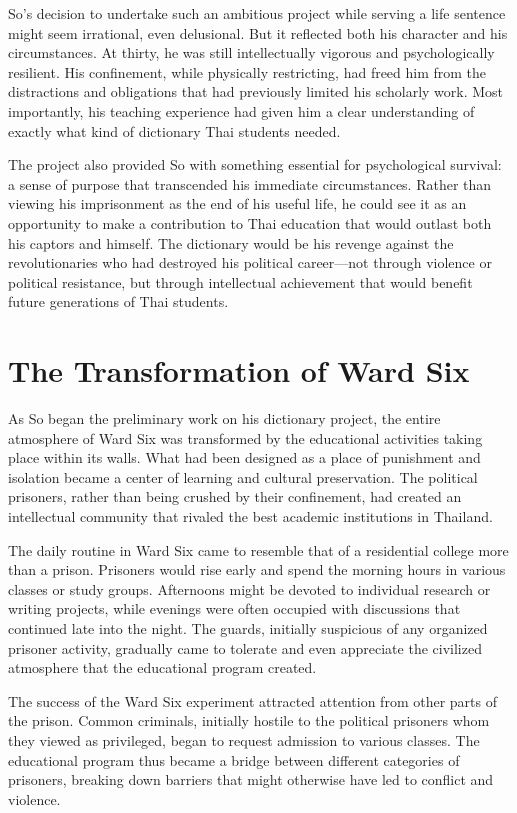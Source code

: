 \documentclass[
  Letterpaper,
]{scrbook}
\begin{document}
So's decision to undertake such an ambitious project while serving a
life sentence might seem irrational, even delusional. But it reflected
both his character and his circumstances. At thirty, he was still
intellectually vigorous and psychologically resilient. His confinement,
while physically restricting, had freed him from the distractions and
obligations that had previously limited his scholarly work. Most
importantly, his teaching experience had given him a clear understanding
of exactly what kind of dictionary Thai students needed.

The project also provided So with something essential for psychological
survival: a sense of purpose that transcended his immediate
circumstances. Rather than viewing his imprisonment as the end of his
useful life, he could see it as an opportunity to make a contribution to
Thai education that would outlast both his captors and himself. The
dictionary would be his revenge against the revolutionaries who had
destroyed his political career---not through violence or political
resistance, but through intellectual achievement that would benefit
future generations of Thai students.

\section{The Transformation of Ward
Six}\label{the-transformation-of-ward-six}

As So began the preliminary work on his dictionary project, the entire
atmosphere of Ward Six was transformed by the educational activities
taking place within its walls. What had been designed as a place of
punishment and isolation became a center of learning and cultural
preservation. The political prisoners, rather than being crushed by
their confinement, had created an intellectual community that rivaled
the best academic institutions in Thailand.

The daily routine in Ward Six came to resemble that of a residential
college more than a prison. Prisoners would rise early and spend the
morning hours in various classes or study groups. Afternoons might be
devoted to individual research or writing projects, while evenings were
often occupied with discussions that continued late into the night. The
guards, initially suspicious of any organized prisoner activity,
gradually came to tolerate and even appreciate the civilized atmosphere
that the educational program created.

The success of the Ward Six experiment attracted attention from other
parts of the prison. Common criminals, initially hostile to the
political prisoners whom they viewed as privileged, began to request
admission to various classes. The educational program thus became a
bridge between different categories of prisoners, breaking down barriers
that might otherwise have led to conflict and violence.
\end{document}
